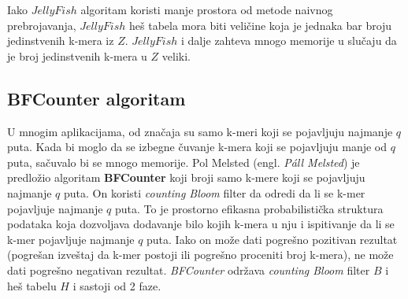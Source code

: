 \documentclass[12pt,oneside]{memoir}
\begin{document}
\begin{comment}
Funkcija $hashEntry()$ sa slike \ref{fig:6} (donji deo slike) ilustruje šemu linearnog popunjavanja za razrešavanje kolizije. Ako $hashEntry(z, h, \frac{N}{\alpha})$ vraća prazan ulaz $H[i]$, onda $z$ ne postoji u heš tabeli i postavljamo $H[i] = z$ i $Count[i] = 1$. U suprotnom, ako $hashEntry(z, h, \frac{N}{\alpha})$ vraća ulaz $H[i] = z$, uvećavamo $Count[i]$ za jedan. Nakon sto su svi k-meri iz $Z$ obrađeni, prikazujemo $(H[i], Count[i])$ za sve ulaze $H[i]$ različite od nule.

JellyFish algoritam je detaljnije objašnjen na slici \ref{fig:6} (gorni deo slike), dok slika \ref{fig:5} (b) daje primer koji ga ilustruje. On je efikasniji, ukoliko ne postoji kolizija. U praksi je očekivani broj kolizija manji, ukoliko za faktor opterećenja važi $\alpha \leq 0.7$. Zatim, očekivano vreme izvršavanja je $O(N)$. Što se tiče prostorne složenosti, tabele $H[]$ i $Count[]$ zahtevaju $\frac{N}{\alpha}(2k + 32)$ bitova, pod pretpostavkom da broj zauzima 32 bita. Gore pomenuta ideja smanjivanja veličine heš tabele je iskorišćena u $JellyFish$ algoritmu.

\begin{figure}[!ht]
  \centering
  \texttt{[image: Jellyfish5\_9.PNG]}
  \caption{Jellyfish algoritam i funkcija hashEntry}
  \label{fig:6}
  \source{\cite{WingKinSung} str. 132, slika 5.9}
\end{figure}

\end{comment}

Iako $JellyFish$ algoritam koristi manje prostora od metode naivnog prebrojavanja, $JellyFish$ heš tabela mora biti veličine koja je jednaka bar broju jedinstvenih k-mera iz $Z$. $JellyFish$ i dalje zahteva mnogo memorije u slučaju da je broj jedinstvenih k-mera u $Z$ veliki.

\subsection{BFCounter algoritam}
U mnogim aplikacijama, od značaja su samo k-meri koji se pojavljuju najmanje $q$ puta. Kada bi moglo da se izbegne čuvanje k-mera koji se pojavljuju manje od $q$ puta, sačuvalo bi se mnogo memorije. Pol Melsted (engl. \textit{Páll Melsted}) je predložio algoritam  \textbf{BFCounter} koji broji samo k-mere koji se pojavljuju najmanje $q$ puta. On koristi \textit{counting Bloom} filter da odredi da li se k-mer pojavljuje najmanje $q$ puta. To je prostorno efikasna probabilistička struktura podataka koja dozvoljava dodavanje bilo kojih k-mera u nju i ispitivanje da li se k-mer pojavljuje najmanje $q$ puta. Iako on može dati pogrešno pozitivan rezultat (pogrešan izveštaj da k-mer postoji ili pogrešno proceniti broj k-mera), ne može dati pogrešno negativan rezultat. \textit{BFCounter} održava \textit{counting Bloom} filter $B$ i heš tabelu $H$ i sastoji od 2 faze. 
\end{document}

